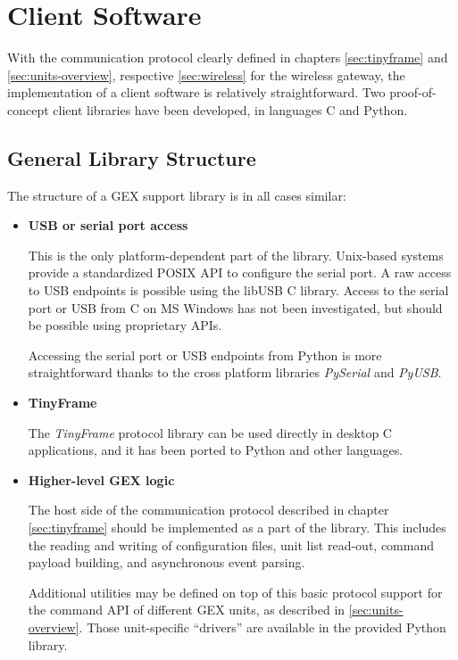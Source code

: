 \chapter{Client Software}

With the communication protocol clearly defined in chapters \ref{sec:tinyframe} and \ref{sec:units-overview}, respective \ref{sec:wireless} for the wireless gateway, the implementation of a client software is relatively straightforward. Two proof-of-concept client libraries have been developed, in languages C and Python.

\section{General Library Structure}

The structure of a GEX support library is in all cases similar:

\begin{itemize}
	\item \textbf{USB or serial port access}
	
		This is the only platform-dependent part of the library. Unix-based systems provide a standardized POSIX API to configure the serial port. A raw access to \gls{USB} endpoints is possible using the libUSB C library. Access to the serial port or \gls{USB} from C on MS Windows has not been investigated, but should be possible using proprietary APIs. 
		
		Accessing the serial port or \gls{USB} endpoints from Python is more straightforward thanks to the cross platform libraries \textit{PySerial} and \textit{PyUSB}.
		
	\item \textbf{TinyFrame} 
	
		The \textit{TinyFrame} protocol library can be used directly in desktop C applications, and it has been ported to Python and other languages.
		 
	\item \textbf{Higher-level GEX logic} 
	
		The host side of the communication protocol described in chapter \ref{sec:tinyframe} should be implemented as a part of the library. This includes the reading and writing of configuration files, unit list read-out, command payload building, and asynchronous event parsing.
		
		Additional utilities may be defined on top of this basic protocol support for the command API of different GEX units, as described in \ref{sec:units-overview}. Those unit-specific ``drivers'' are available in the provided Python library.
\end{itemize}

